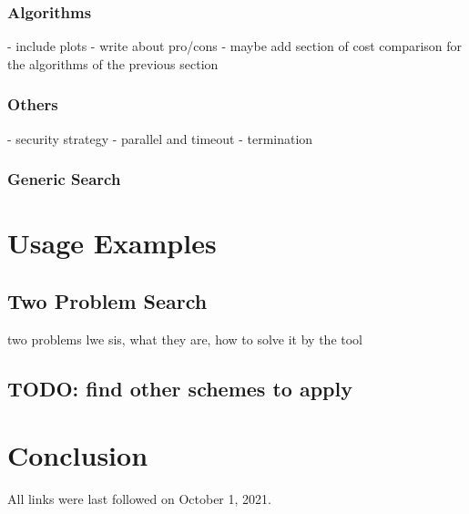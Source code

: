 \documentclass[
  a4paper,  %
  twoside,  %
  bibliography=totoc,
  headsepline,
  cleardoublepage=empty,
  parskip=half,
  draft=false
]{scrbook}
\begin{document}
\subsection{Algorithms}
- include plots
- write about pro/cons
- maybe add section of cost comparison for the algorithms of the previous section


\subsection{Others}
- security strategy
- parallel and timeout
- termination

\subsection{Generic Search}











\chapter{Usage Examples}
\section{Two Problem Search}\label{sec:two-problem-search}
two problems lwe sis, what they are, how to solve it by the tool
\section{TODO: find other schemes to apply}


\chapter{Conclusion}

\printbibliography

All links were last followed on October 1, 2021.


\pagestyle{empty}
\renewcommand*{\chapterpagestyle}{empty}
\Versicherung
\end{document}
